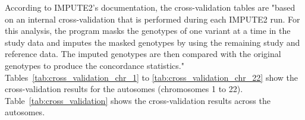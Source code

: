 
According to IMPUTE2's documentation, the cross-validation tables are "based on
an internal cross-validation that is performed during each IMPUTE2 run. For
this analysis, the program masks the genotypes of one variant at a time in the
study data and imputes the masked genotypes by using the remaining study and
reference data. The imputed genotypes are then compared with the original
genotypes to produce the concordance statistics."\\

Tables~\ref{tab:cross_validation_chr_1} to \ref{tab:cross_validation_chr_22}
show the cross-validation results for the autosomes (chromosomes 1 to 22).
Table~\ref{tab:cross_validation} shows the cross-validation results across the
autosomes.


\pagebreak

